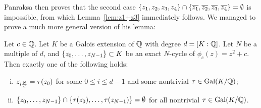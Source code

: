 Panraksa then proves that the second case $\{z_1, z_2, z_3, z_4\} \cap
\{\overline{z_1}, \overline{z_2}, \overline{z_3}, \overline{z_4}\} = \emptyset$ is impossible, from
which Lemma~\ref{lem:z1+z3} immediately follows. We managed to prove a
much more general version of his lemma:

\newcommand{\nd}{\frac{N}{d}}

\begin{theorem}
  Let $c \in \mathbb{Q}$. Let $K$ be a Galois extension of $\mathbb{Q}$ with degree $d
  = [K : \mathbb{Q}]$. Let $N$ be a multiple of $d$, and $\left\{z_0, \dots,
    z_{N-1}\right\} \subset K$ be an exact $N$-cycle of $\phi_c(z) = z^2 +
  c$. Then exactly one of the following holds:
  \begin{enumerate}[(i)]
  \item $z_{i\nd} = \t(z_0)$ for some $0 \le i \le d-1$ and some
    nontrivial $\tau \in \mathrm{Gal}(K/\mathbb{Q})$;

  \item $\left\{z_0, \dots, z_{N-1}\right\} \cap \left\{\tau(z_0), \dots, \tau(z_{N-1})\right\} =
    \emptyset$ for all nontrivial $\tau \in \mathrm{Gal}(K/\mathbb{Q})$.
  \end{enumerate}
\end{theorem}

